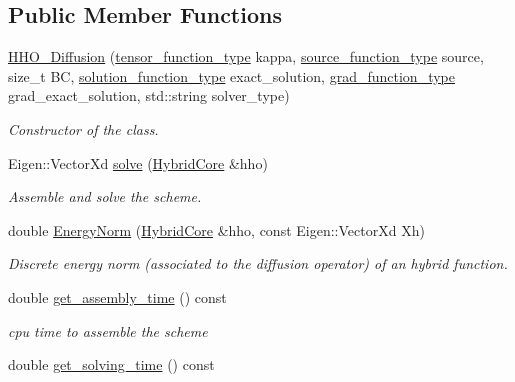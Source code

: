 \subsection*{Public Member Functions}
\begin{DoxyCompactItemize}
\item 
\hyperlink{group__HHO__Diffusion_ga9ab2e2cdf0c77f60069f7572c587c4f1}{H\+H\+O\+\_\+\+Diffusion} (\hyperlink{classHArDCore2D_1_1HHO__Diffusion_acc4abb92b452d6407d45a87823fb47f9}{tensor\+\_\+function\+\_\+type} kappa, \hyperlink{classHArDCore2D_1_1HHO__Diffusion_ade095df766ff04bf09385a163136e5c0}{source\+\_\+function\+\_\+type} source, size\+\_\+t BC, \hyperlink{classHArDCore2D_1_1HHO__Diffusion_ac2ddc18a37be70e4767a9040fb6a09f6}{solution\+\_\+function\+\_\+type} exact\+\_\+solution, \hyperlink{classHArDCore2D_1_1HHO__Diffusion_a14797a72cc96ee5ea6fc45e4986d6a84}{grad\+\_\+function\+\_\+type} grad\+\_\+exact\+\_\+solution, std\+::string solver\+\_\+type)
\begin{DoxyCompactList}\small\item\em Constructor of the class. \end{DoxyCompactList}\item 
Eigen\+::\+Vector\+Xd \hyperlink{group__HHO__Diffusion_ga1aebf22f19de92c115aed69ba394de88}{solve} (\hyperlink{classHArDCore2D_1_1HybridCore}{Hybrid\+Core} \&hho)
\begin{DoxyCompactList}\small\item\em Assemble and solve the scheme. \end{DoxyCompactList}\item 
double \hyperlink{group__HHO__Diffusion_ga1f21d17ee818df40d6c0081300c44982}{Energy\+Norm} (\hyperlink{classHArDCore2D_1_1HybridCore}{Hybrid\+Core} \&hho, const Eigen\+::\+Vector\+Xd Xh)
\begin{DoxyCompactList}\small\item\em Discrete energy norm (associated to the diffusion operator) of an hybrid function. \end{DoxyCompactList}\item 
double \hyperlink{group__HHO__Diffusion_ga4b67f061d06b1aea5a626792a2bddd1e}{get\+\_\+assembly\+\_\+time} () const
\begin{DoxyCompactList}\small\item\em cpu time to assemble the scheme \end{DoxyCompactList}\item 
double \hyperlink{group__HHO__Diffusion_ga0ba01c42bc116f962b6982b27e95b471}{get\+\_\+solving\+\_\+time} () const

\end{DoxyCompactItemize}
